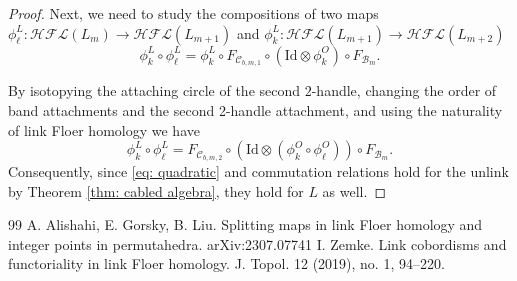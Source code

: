 \documentclass[10pt,a4paper]{amsart}
\theoremstyle{plain}
\newcommand{\cHFL}{\mathcal{H\!F\! L}}
\newcommand{\Id}{\mathrm{Id}}
\begin{document}
\begin{proof}
Next, we need to study the compositions of two maps $\phi_{\ell}^{L}: \cHFL(L_{m})\rightarrow\cHFL(L_{m+1})$ and $\phi_{k}^{L}: \cHFL(L_{ m+1})\rightarrow\cHFL(L_{ m+2})$
$$
\phi_{k}^{L}\circ \phi_{\ell}^{L}=
\phi_{k}^{L}\circ
F_{\mathcal{C}_{b,m,1}}\circ \left(\Id\otimes \phi_k^{O}\right)\circ F_{\mathcal{B}_{m}}.
$$



By isotopying the attaching circle of the second $2$-handle, changing the order of band attachments and the second 2-handle attachment, and using the naturality of link Floer homology we have
$$
\phi_{k}^{L}\circ \phi_{\ell}^{L}=F_{\mathcal{C}_{b,m,2}}\circ \left(\Id\otimes \left(\phi_{k}^{O}\circ\phi_{\ell}^{O}\right)\right)\circ F_{\mathcal{B}_{m}}.
$$
Consequently, since \eqref{eq: quadratic} and commutation relations hold for the unlink by Theorem \ref{thm: cabled algebra}, they hold for $L$ as well. 
\end{proof}

\begin{thebibliography}{99}
 A. Alishahi, E. Gorsky, B. Liu. Splitting maps in link Floer homology and integer points in permutahedra. arXiv:2307.07741
 I. Zemke. Link cobordisms and functoriality in link Floer homology. J. Topol. 12 (2019), no. 1, 94--220.
\end{thebibliography}
\end{document}
